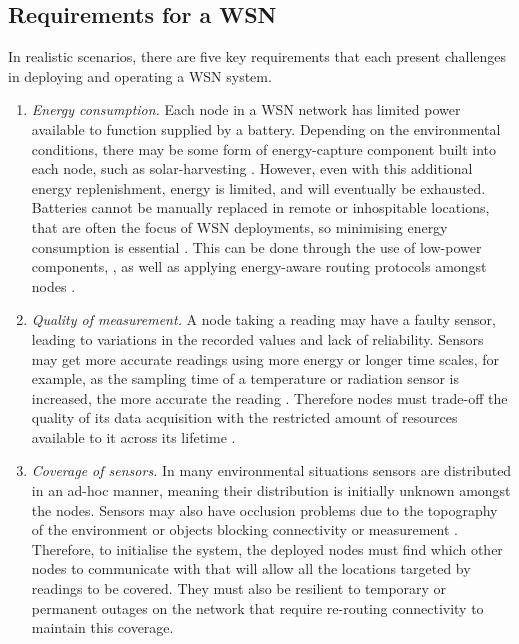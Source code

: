 \subsection{Requirements for a WSN}
\label{section:background:requirements}
In realistic scenarios, there are five key requirements that each present challenges in deploying and operating a WSN system.
\begin{enumerate}
\item \label{requirement:energy}\textit{Energy consumption.} Each node in a WSN network has limited power available to function supplied by a battery. Depending on the environmental conditions, there may be some form of energy-capture component built into each node, such as solar-harvesting \citep{Prauzek2018}. However, even with this additional energy replenishment, energy is limited, and will eventually be exhausted. Batteries cannot be manually replaced in remote or inhospitable locations, that are often the focus of WSN deployments, so minimising energy consumption is essential \citep{Anastasi2009}. This can be done through the use of low-power components, \citep{4772585, 8108667}, as well as applying energy-aware routing protocols amongst nodes \citep{s90100445}. 

\item \label{requirement:quality} \textit{Quality of measurement.} A node taking a reading may have a faulty sensor, leading to variations in the recorded values and lack of reliability. Sensors may get more accurate readings using more energy or longer time scales, for example, as the sampling time of a temperature or radiation sensor is increased, the more accurate the reading \citep{s17061221}. Therefore nodes must trade-off the quality of its data acquisition with the restricted amount of resources available to it across its lifetime \citep{7845391}.

\item \label{requirement:coverage} \textit{Coverage of sensors.} In many environmental situations sensors are distributed in an ad-hoc manner, meaning their distribution is initially unknown amongst the nodes. Sensors may also have occlusion problems due to the topography of the environment or objects blocking connectivity or measurement \citep{10.1007/978-3-540-69170-9_23}. Therefore, to initialise the system, the deployed nodes must find which other nodes to communicate with that will allow all the locations targeted by readings to be covered. They must also be resilient to temporary or permanent outages on the network that require re-routing connectivity to maintain this coverage.


\end{enumerate}
